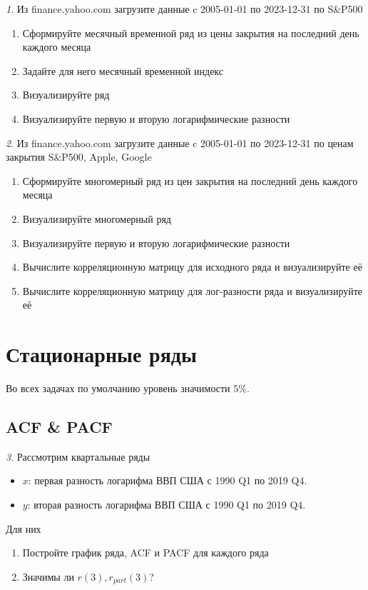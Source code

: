 \documentclass[12pt]{article}
\theoremstyle{remark}
\newtheorem{exercise}{}[subsection]
\begin{document}
\begin{exercise}
Из finance.yahoo.com загрузите данные c 2005-01-01 по 2023-12-31 по S\&P500
\begin{enumerate}
	\item Сформируйте месячный временной ряд из цены закрытия на последний день каждого месяца
	\item Задайте для него месячный временной индекс
	\item Визуализируйте ряд
	\item Визуализируйте первую и вторую логарифмические разности
\end{enumerate}
\end{exercise}

\begin{exercise}
Из finance.yahoo.com загрузите данные c 2005-01-01 по 2023-12-31 по
ценам закрытия S\&P500, Apple, Google
\begin{enumerate}
	\item Сформируйте многомерный ряд из цен закрытия на последний день каждого месяца
	\item Визуализируйте многомерный ряд
	\item Визуализируйте первую и вторую логарифмические разности
	\item Вычислите корреляционную матрицу для исходного ряда и визуализируйте её
	\item Вычислите корреляционную матрицу для лог-разности ряда и визуализируйте её
\end{enumerate}
\end{exercise}

\section{Стационарные ряды}

Во всех задачах по умолчанию уровень значимости 5\%.

\subsection{ACF \& PACF}

\begin{exercise}
Рассмотрим квартальные ряды
\begin{itemize}
	\item \(x\): первая разность логарифма ВВП США с 1990 Q1 по
	2019 Q4.
	\item \(y\): вторая разность логарифма ВВП США с 1990 Q1 по
	2019 Q4.
\end{itemize}
Для них
\begin{enumerate}
	\item Постройте график ряда, ACF и PACF для каждого ряда
	\item Значимы ли \(r(3),r_{part}(3)\)?
\end{enumerate}
\end{exercise}
\end{document}
